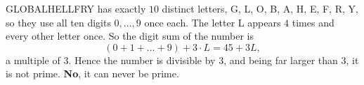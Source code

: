GLOBALHELLFRY has exactly $10$ distinct letters, G, L, O, B, A, H, E, F, R, Y, so they use all ten digits $0,\dots,9$ once each. The letter L appears $4$ times and every other letter once. So the digit sum of the number is
\[
(0+1+\dots+9)+3\cdot L=45+3L,
\]
a multiple of $3$. Hence the number is divisible by $3$, and being far larger than $3$, it is not prime. \textbf{No}, it can never be prime.
